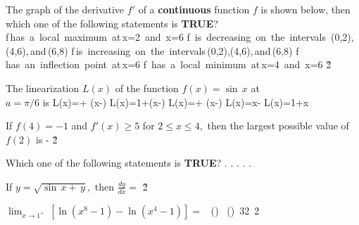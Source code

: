 \documentclass[amsfonts,bezier,leqno,fleqn,12pt,a4paper]{article}
\begin{document}
{\begin{large}
\item %
The graph of the derivative $f'$ of a \textbf{continuous} function $f$ is shown below, then which one of the following statements is \textbf{TRUE}?\\[0.5in]
\sc
\be
f\,\mbox{has a local maximum at}\,x=2 \,\mbox{and}\, x=6
\ee
\be
f\, \mbox{is decreasing on the intervals}\, (0,2), (4,6),\,\mbox{and}\,(6,8)
\ee
\be
f\,\mbox{is increasing on the intervals}\,(0,2),(4,6),\,\mbox{and}\,(6,8)
\ee
\be
f\, \mbox{has an inflection point at}\,x=6
\ee
\be
f\, \mbox{has a local minimum at}\,x=4 \,\mbox{and}\, x=6
\ee
\v2



\item %
The linearization  $L(x)$ of the function $f(x)=\sin\,x$ at \\$a=\pi/6$ is
\sc
\be
\displaystyle L(x)=+ \left(x-\right)
\ee
\be
\displaystyle L(x)=1+\left(x-\right)
\ee
\be
\displaystyle L(x)=+ \left(x-\right)
\ee
\be
\displaystyle L(x)=x-
\ee
\be
\displaystyle L(x)=1+x
\ee

\newpage



\item %
If $f(4)=-1$ and $f'(x)\geq 5$ for $2\leq x \leq 4,$ then the largest possible value of $f(2)$ is
\sc
\be
\displaystyle -
\ee
{}
\ee
{}
\ee
{}
\ee
{}
\ee
\v2



\item %
Which one of the following statements is \textbf{TRUE}?
\sc
\be
.
\ee
\be
.
\ee
\be
.
\ee
\be
.
\ee
\be
.
\ee

\newpage



\item %
If $y=\sqrt{\sin \,x+\,y},$ then $\displaystyle \frac{dy}{dx}=$
\sc
\be
\displaystyle {}
\ee
\be
\displaystyle {}
\ee
\be
\displaystyle {}
\ee
\be
\displaystyle {}
\ee
\be
\displaystyle {}
\ee
\v2



\item %
$\displaystyle \lim_{x\rightarrow 1^+}\, \left[ \ln(x^8-1)-\ln(x^4-1)\right]=$
\sc
\be
\displaystyle \ln\, \left(\displaystyle{}\right)
\ee
\be
\displaystyle \ln\, \left(\displaystyle{}\right)
\ee
\be
\ln\,32
\ee
\be
\ln\,2
\ee
{}
\ee


\end{large}}
\end{document}
